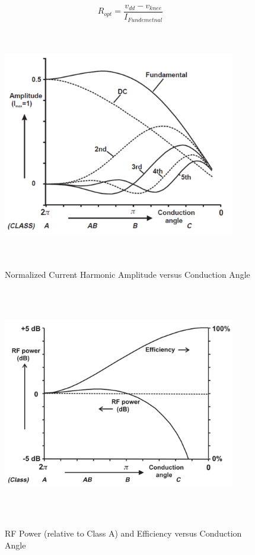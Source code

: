 \begin{equation}\label{eq:opt_load}
  R_{opt} = \frac{v_{dd}-v_{knee}}{I_{Fundemetnal}}
\end{equation}

\begin{figure}
  \centering
  \includegraphics[width=4in,height=4in,keepaspectratio]{figures/classes/bias_current_harmonic}\\
  \caption{Normalized Current Harmonic Amplitude versus Conduction Angle \cite{C.Cripps2006}}
  \label{fig:bias_current_harmonic}
\end{figure}

\begin{figure}
  \centering
  \includegraphics[width=4in,height=4in,keepaspectratio]{figures/classes/bias_power_eff}\\
  \caption{RF Power (relative to Class A) and Efficiency versus Conduction Angle \cite{C.Cripps2006}}
  \label{fig:bias_power_eff}
\end{figure}

